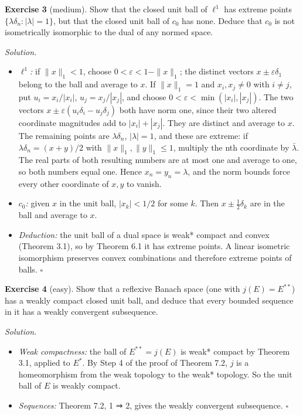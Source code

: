 \documentclass[
  english,
  11pt,
  a4paper,
]{article}
\newcounter{none} %
\providecommand{\tightlist}{%
  \setlength{\itemsep}{0pt}\setlength{\parskip}{0pt}}
\begin{document}
\textbf{Exercise 3} (medium). Show that the closed unit ball of
\(\ell^1\) has extreme points \(\{\lambda\delta_n:|\lambda|=1\}\), but
that the closed unit ball of \(c_0\) has none. Deduce that \(c_0\) is
not isometrically isomorphic to the dual of any normed space.

\emph{Solution.}

\begin{itemize}
\tightlist
\item
  \emph{\(\ell^1\):} if \(\|x\|_1<1\), choose
  \(0<\varepsilon<1-\|x\|_1\); the distinct vectors
  \(x\pm\varepsilon\delta_1\) belong to the ball and average to \(x\).
  If \(\|x\|_1=1\) and \(x_i,x_j\ne0\) with \(i\ne j\), put
  \(u_i=x_i/|x_i|\), \(u_j=x_j/|x_j|\), and choose
  \(0<\varepsilon<\min(|x_i|,|x_j|)\). The two vectors
  \(x\pm\varepsilon(u_i\delta_i-u_j\delta_j)\) both have norm one, since
  their two altered coordinate magnitudes add to \(|x_i|+|x_j|\). They
  are distinct and average to \(x\). The remaining points are
  \(\lambda\delta_n\), \(|\lambda|=1\), and these are extreme: if
  \(\lambda\delta_n=(x+y)/2\) with \(\|x\|_1,\|y\|_1\leq1\), multiply
  the nth coordinate by \(\bar\lambda\). The real parts of both
  resulting numbers are at most one and average to one, so both numbers
  equal one. Hence \(x_n=y_n=\lambda\), and the norm bounds force every
  other coordinate of \(x,y\) to vanish.
\item
  \emph{\(c_0\):} given \(x\) in the unit ball, \(|x_k|<1/2\) for some
  \(k\). Then \(x\pm\frac12\delta_k\) are in the ball and average to
  \(x\).
\item
  \emph{Deduction:} the unit ball of a dual space is weak* compact and
  convex (Theorem 3.1), so by Theorem 6.1 it has extreme points. A
  linear isometric isomorphism preserves convex combinations and
  therefore extreme points of balls. \(\square\)
\end{itemize}

\textbf{Exercise 4} (easy). Show that a reflexive Banach space (one with
\(j(E)=E^{**}\)) has a weakly compact closed unit ball, and deduce that
every bounded sequence in it has a weakly convergent subsequence.

\emph{Solution.}

\begin{itemize}
\tightlist
\item
  \emph{Weak compactness:} the ball of \(E^{**}=j(E)\) is weak* compact
  by Theorem 3.1, applied to \(E^*\). By Step 4 of the proof of Theorem
  7.2, \(j\) is a homeomorphism from the weak topology to the weak*
  topology. So the unit ball of \(E\) is weakly compact.
\item
  \emph{Sequences:} Theorem 7.2, 1 ⇒ 2, gives the weakly convergent
  subsequence. \(\square\)
\end{itemize}
\end{document}
